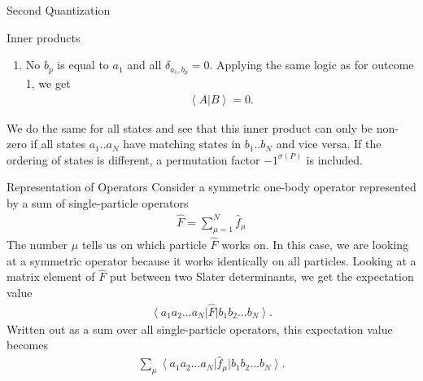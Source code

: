 \documentclass[twoside,english]{uiofysmaster}
\begin{document}
\begin{chapter}{Second Quantization}
\begin{section}{Inner products}
\begin{enumerate}
\begin{align}
				\label{InnerProduct1}
			\end{align}
			This will now give us a new and shorter inner product
			\begin{align}
				\left< A | B \right> = \left< 0 \right| \hat a_N ... \hat a_2 \hat b_1^\dagger... \hat b_{p-1}^\dagger \hat b_{p+1}^\dagger ... \hat b_N^\dagger \left| 0 \right>(-1)^{p-1} - \left< 0 \right| \hat a_N ... \hat a_2 \hat b_1^\dagger \hat b_2^\dagger ... \hat b_N^\dagger \hat a_1  \left| 0 \right>,
			\end{align}
			where the last term will vanish because of $\hat a_1 \left| 0 \right> = 0$. Notice the sign factor coming from $(-1)^{p-1}$. This is due to interchanging creation operators when moving $\hat b_p^\dagger$ from position $p$ and $(p-1)$ steps to the left before using (\ref{InnerProduct1}).  
			\item No $b_p$ is equal to $a_1$ and all $\delta_{a_1, b_p} = 0$. Applying the same logic as for outcome 1, we get
			\begin{align}
				\left< A | B \right> = 0.
			\end{align}
		\end{enumerate}
		We do the same for all states and see that this inner product can only be non-zero if all states $a_1 .. a_N$ have  matching states in $b_1 .. b_N$ and vice versa. If the ordering of states is different, a permutation factor $-1^{\sigma(P)}$ is included. 
	\end{section}

	\begin{section}{Representation of Operators}
		Consider a symmetric one-body operator represented by a sum of single-particle operators
		\begin{align}
			\hat F = \sum_{\mu = 1}^N \hat f_\mu 
		\end{align}
		The number $\mu$ tells us on which particle $\hat F$ works on. In this case, we are looking at a symmetric operator because it works identically on all particles. Looking at a matrix element of $\hat F$ put between two Slater determinants, we get the expectation value
		\begin{align}
			\left< a_1 a_2 ... a_N \right| \hat F \left| b_1 b_2 ... b_N \right>.
		\end{align}
		Written out as a sum over all single-particle operators, this expectation value becomes 
		\begin{align}
			\sum_\mu \left< a_1 a_2 ... a_N \right| \hat f_\mu \left| b_1 b_2 ... b_N \right>.
		\end{align}


\end{section}
\end{chapter}
\end{document}
